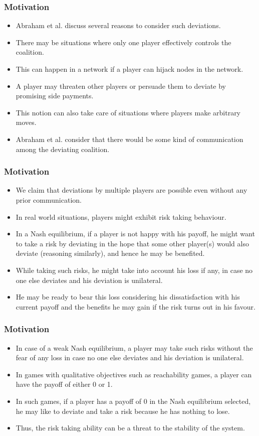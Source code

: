 \documentclass{beamer}
\begin{document}
\begin{frame}
\frametitle{Motivation}
  \begin{itemize}
	\item Abraham et al. \cite{Abraham-2006} discuss several reasons to consider such deviations.
	\item There may be situations where only one player effectively controls the coalition.
 	\item This can happen in a network if a player can hijack nodes in the network.
 	\item A player may threaten other players or persuade them to deviate by promising side payments. 
 	\item This notion can also take care of situations where players make arbitrary moves.
  	\item Abraham et al. \cite{Abraham-2006,Abraham-2008} consider that there would be some kind of communication among the deviating coalition.
  \end{itemize}
\end{frame}

\begin{frame}
\frametitle{Motivation}
  \begin{itemize}
	\item We claim that deviations by multiple players are possible even without any prior communication.
	\item In real world situations, players might exhibit risk taking behaviour.
 	\item In a Nash equilibrium, if a player is not happy with his payoff, he might want to take a risk by deviating in the hope that some other player(s) would also deviate (reasoning similarly), and hence he may be benefited.
 	\item While taking such risks, he might take into account his loss if any, in case no one else deviates and his deviation is unilateral.
 	\item He may be ready to bear this loss considering his dissatisfaction with his current payoff and the benefits he may gain if the risk turns out in his favour.
  \end{itemize}
\end{frame}

\begin{frame}
\frametitle{Motivation}
  \begin{itemize}
 	\item In case of a weak Nash equilibrium, a player may take such risks without the fear of any loss in case no one else deviates and his deviation is unilateral.
 	\item In games with qualitative objectives such as reachability games, a player can have the payoff of either 0 or 1.
 	\item In such games, if a player has a payoff of 0 in the Nash equilibrium selected, he may like to deviate and take a risk because he has nothing to lose.
 	\item Thus, the risk taking ability can be a threat to the stability of the system.
  \end{itemize}
\end{frame}
\end{document}
